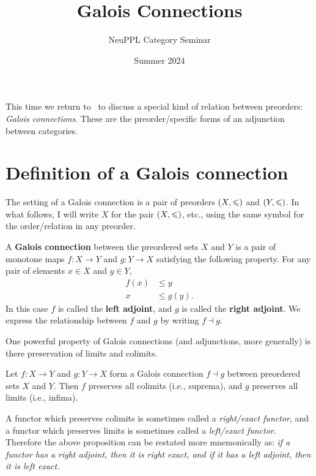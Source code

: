 \documentclass[../main.tex]{subfiles}
\begin{document}
\title{Galois Connections}
\author{NeuPPL Category Seminar}
\date{Summer 2024}

\makehmtitle%

This time we return to~\cite{Fong2019} to discuss a special kind of relation
between preorders: \emph{Galois connections}. These are the preorder\-/specific
forms of an adjunction between categories.

\section{Definition of a Galois connection}

The setting of a Galois connection is a pair of preorders \({\left(X,\leqslant\right)}\) and
\({\left(Y,\leqslant\right)}\). In what follows, I will write \(X\) for the pair
\({\left(X,\leqslant\right)}\), etc., using the same symbol for the order\-/relation in any
preorder.
\begin{definition}
  A \textbf{Galois connection} between the preordered sets \(X\) and \(Y\) is a
  pair of monotone maps \(f: X \to Y\) and \(g: Y \to X\) satisfying the
  following property. For any pair of elements \(x \in X\) and \(y \in Y\),
  \[%
    \begin{array}{rl}
      f(x) &\leq y \\\hline\hline
      x &\leq g(y).
    \end{array}
  \]%
  In this case \(f\) is called the \textbf{left adjoint}, and \(g\) is called
  the \textbf{right adjoint}. We express the relationship between \(f\) and
  \(g\) by writing \(f \dashv g\).
\end{definition}
One powerful property of Galois connections (and adjunctions, more generally) is
there preservation of limits and colimits.
\begin{proposition}\label{prop:adjoints-preserve-limits}
  Let \(f: X \to Y\) and \(g: Y \to X\) form a Galois connection \(f \dashv g\)
  between preordered sets \(X\) and \(Y\). Then \(f\) preserves all colimits (i.e.,
  suprema), and \(g\) preserves all limits (i.e., infima).
\end{proposition}
\begin{remark}
  A functor which preserves colimits is sometimes called a \emph{right\-/exact
    functor}, and a functor which preserves limits is sometimes called a
  \emph{left\-/exact functor}. Therefore the above proposition can be restated
  more mnemonically as: \emph{if a functor has a right adjoint, then it
    is right exact, and if it has a left adjoint, then it is left exact.} 
\end{remark}
\end{document}
